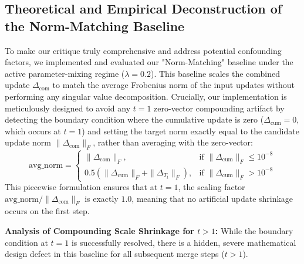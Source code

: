 \documentclass{article}
\theoremstyle{plain}
\theoremstyle{definition}
\theoremstyle{remark}
\begin{document}
\subsection{Theoretical and Empirical Deconstruction of the Norm-Matching Baseline}
\label{sec:appendix_norm}
To make our critique truly comprehensive and address potential confounding factors, we implemented and evaluated our "Norm-Matching" baseline under the active parameter-mixing regime ($\lambda = 0.2$). This baseline scales the combined update $\Delta_{\text{com}}$ to match the average Frobenius norm of the input updates without performing any singular value decomposition. Crucially, our implementation is meticulously designed to avoid any $t=1$ zero-vector compounding artifact by detecting the boundary condition where the cumulative update is zero ($\Delta_{\text{cum}} = 0$, which occurs at $t=1$) and setting the target norm exactly equal to the candidate update norm $\|\Delta_{\text{com}}\|_F$, rather than averaging with the zero-vector:
\begin{equation}
  \text{avg\_norm} = 
  \begin{cases}
    \|\Delta_{\text{com}}\|_F, & \text{if } \|\Delta_{\text{cum}}\|_F \le 10^{-8} \\
    0.5 (\|\Delta_{\text{cum}}\|_F + \|\Delta_{T_t}\|_F), & \text{if } \|\Delta_{\text{cum}}\|_F > 10^{-8}
  \end{cases}
\end{equation}
This piecewise formulation ensures that at $t=1$, the scaling factor $\text{avg\_norm} / \|\Delta_{\text{com}}\|_F$ is exactly $1.0$, meaning that no artificial update shrinkage occurs on the first step.

\textbf{Analysis of Compounding Scale Shrinkage for $t > 1$:} 
While the boundary condition at $t=1$ is successfully resolved, there is a hidden, severe mathematical design defect in this baseline for all subsequent merge steps ($t > 1$). 
\end{document}
